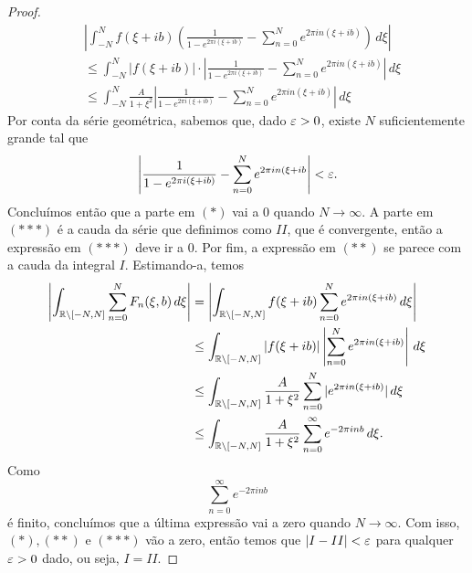 \begin{proof}
        \begin{align*}
            &\left|\int_{-N}^{N} f(\xi + ib)\left(\frac{1}{1 - e^{2\pi i(\xi + ib)}} - \sum_{n=0}^{N}e^{2\pi i n(\xi + ib)}\right) \, d\xi \right| \\
            &\leq \int_{-N}^{N} |f(\xi + ib)|\cdot\left|\frac{1}{1 - e^{2\pi i(\xi + ib)}} - \sum_{n=0}^{N}e^{2\pi i n(\xi + ib)}\right| \, d\xi \\
            &\leq \int_{-N}^{N} \frac{A}{1 + \xi^2}\left|\frac{1}{1 - e^{2\pi i(\xi + ib)}} - \sum_{n=0}^{N}e^{2\pi i n(\xi + ib)}\right| \, d\xi 
        \end{align*}
        Por conta da série geométrica, sabemos que, dado $\varepsilon>0$, existe 
        $N$ suficientemente grande tal que
        \begin{equation*}
            \left|\frac{1}{1 - e^{2\pi i(\xi + ib)}} - 
            \sum_{n=0}^{N}e^{2\pi i n(\xi + ib}\right| < \varepsilon. 
        \end{equation*}
        Concluímos então que a parte em $(*)$ vai a $0$ quando $N \to \infty$. 
        A parte em $(***)$ é a cauda da série que definimos como $II$, 
        que é convergente, então a expressão em $(***)$ deve ir a $0$. 
        Por fim, a expressão em $(**)$ se parece com a cauda da integral $I$.
        Estimando-a, temos
        \begin{align*}
            \left|\int_{\mathbb{R} \setminus [-N,N]}\sum_{n=0}^{N}F_n(\xi,b) \, d\xi\right| 
            &= \left|\int_{\mathbb{R} \setminus [-N,N]}f(\xi + ib)\sum_{n=0}^{N}
            e^{2\pi i n(\xi + ib)} \, d\xi\right| \\
            &\leq \int_{\mathbb{R} \setminus [-N,N]}|f(\xi + ib)|\left|\sum_{n=0}^{N}
            e^{2\pi i n(\xi + ib)} \right|\, d\xi \\
            &\leq \int_{\mathbb{R} \setminus [-N,N]}\frac{A}{1 + \xi^2} 
            \sum_{n=0}^{N}|e^{2\pi i n(\xi + ib)}| \, d\xi \\
            &\leq \int_{\mathbb{R} \setminus [-N,N]}\frac{A}{1 + \xi^2}
            \sum_{n=0}^{\infty}e^{-2\pi i nb} \, d\xi. 
        \end{align*}
        Como 
        \begin{equation*}
            \sum_{n=0}^{\infty}e^{-2\pi i nb}
        \end{equation*}
        é finito, concluímos que 
        a última expressão vai a zero quando $N \to \infty$. Com isso, 
        $(*), (**)$ e $(***)$ vão a zero, então temos que $|I - II|< \varepsilon$ para 
        qualquer $\varepsilon>0$ dado, ou seja, $I = II$.
        \end{proof}
